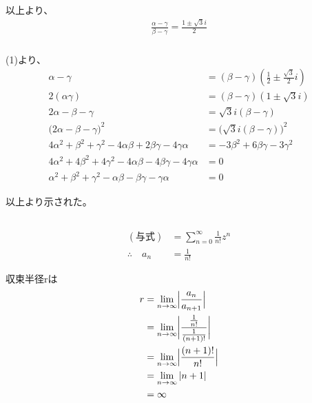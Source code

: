 \documentclass[dvipdfmx,a4paper]{jsarticle}
\begin{document}
以上より、
\begin{align*}
\frac{\alpha-\gamma}{\beta-\gamma} = \frac{1\pm\sqrt{3}i}{2}
\end{align*}

\subsubsection{}

(1)より、
\begin{align*}
\alpha-\gamma &= (\beta-\gamma)(\frac{1}{2} \pm \frac{\sqrt{3}}{2}i)\\
2(\alpha\gamma) &= (\beta-\gamma)(1\pm\sqrt{3}i)\\
2\alpha - \beta - \gamma &= \sqrt{3}i(\beta - \gamma)\\
\bigl(2\alpha - \beta - \gamma\bigr)^2 &= \bigl(\sqrt{3}i(\beta - \gamma)\bigr)^2\\
4\alpha^2 + \beta^2 + \gamma^2 - 4\alpha\beta + 2\beta\gamma - 4\gamma\alpha &= -3\beta^2 +6\beta\gamma -3\gamma^2\\
4\alpha^2 + 4\beta^2 + 4\gamma^2 - 4\alpha\beta - 4\beta\gamma - 4\gamma\alpha &= 0\\
\alpha^2 + \beta^2 + \gamma^2 - \alpha\beta -\beta\gamma -\gamma\alpha &= 0
\end{align*}

以上より示された。


\subsection{}

\subsubsection{}
\begin{align*}
(与式) &= \sum_{n=0}^{\infty}\frac{1}{n!}z^n\\
\therefore\quad
a_n &= \frac{1}{n!}
\end{align*}

収束半径rは
\begin{align*}
r &= \lim_{n \to \infty}\Bigl|\frac{a_n}{a_{n+1}}\Bigr|\\
&= \lim_{n \to \infty}\biggl|\frac{\frac{1}{n!}}{\frac{1}{(n+1)!}}\biggr|\\
&= \lim_{n \to \infty}\Bigl|\frac{(n+1)!}{n!}\Bigr|\\
&= \lim_{n\to \infty}|n+1|\\
&= \infty
\end{align*}
\end{document}
